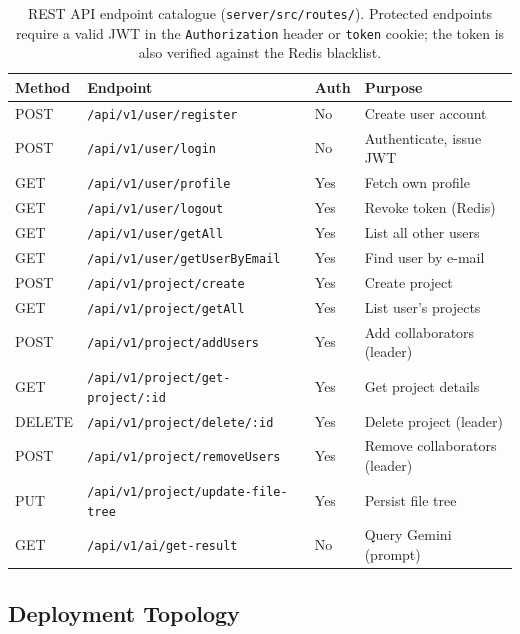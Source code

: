 \begin{table}[H]
  \centering
  \caption{REST API endpoint catalogue (\texttt{server/src/routes/}).
    Protected endpoints require a valid JWT in the \texttt{Authorization}
    header or \texttt{token} cookie; the token is also verified against the
    Redis blacklist.}
  \label{tab:api}
  \setlength{\tabcolsep}{4pt}
  \begin{tabular}{llll}
    \toprule
    \textbf{Method} & \textbf{Endpoint} & \textbf{Auth} & \textbf{Purpose} \\
    \midrule
    POST   & \texttt{/api/v1/user/register}        & No  & Create user account \\
    POST   & \texttt{/api/v1/user/login}            & No  & Authenticate, issue JWT \\
    GET    & \texttt{/api/v1/user/profile}          & Yes & Fetch own profile \\
    GET    & \texttt{/api/v1/user/logout}           & Yes & Revoke token (Redis) \\
    GET    & \texttt{/api/v1/user/getAll}           & Yes & List all other users \\
    GET    & \texttt{/api/v1/user/getUserByEmail}   & Yes & Find user by e-mail \\
    \midrule
    POST   & \texttt{/api/v1/project/create}        & Yes & Create project \\
    GET    & \texttt{/api/v1/project/getAll}        & Yes & List user's projects \\
    POST   & \texttt{/api/v1/project/addUsers}      & Yes & Add collaborators (leader) \\
    GET    & \texttt{/api/v1/project/get-project/:id}& Yes & Get project details \\
    DELETE & \texttt{/api/v1/project/delete/:id}   & Yes & Delete project (leader) \\
    POST   & \texttt{/api/v1/project/removeUsers}  & Yes & Remove collaborators (leader) \\
    PUT    & \texttt{/api/v1/project/update-file-tree}& Yes & Persist file tree \\
    \midrule
    GET    & \texttt{/api/v1/ai/get-result}         & No  & Query Gemini (prompt) \\
    \bottomrule
  \end{tabular}
\end{table}

\subsection{Deployment Topology}

